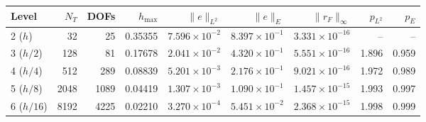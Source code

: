 \begin{tabular}{@{}lrrrrrrrr@{}}
\toprule
Level & $N_T$ & DOFs & $h_{\max}$ & $\|e\|_{L^2}$ & $\|e\|_E$ & $\|r_F\|_\infty$ & $p_{L^2}$ & $p_E$\\
\midrule
2 ($h$) & 32 & 25 & 0.35355 & $7.596\times10^{-2}$ & $8.397\times10^{-1}$ & $3.331\times10^{-16}$ & -- & --\\
3 ($h/2$) & 128 & 81 & 0.17678 & $2.041\times10^{-2}$ & $4.320\times10^{-1}$ & $5.551\times10^{-16}$ & 1.896 & 0.959\\
4 ($h/4$) & 512 & 289 & 0.08839 & $5.201\times10^{-3}$ & $2.176\times10^{-1}$ & $9.021\times10^{-16}$ & 1.972 & 0.989\\
5 ($h/8$) & 2048 & 1089 & 0.04419 & $1.307\times10^{-3}$ & $1.090\times10^{-1}$ & $1.457\times10^{-15}$ & 1.993 & 0.997\\
6 ($h/16$) & 8192 & 4225 & 0.02210 & $3.270\times10^{-4}$ & $5.451\times10^{-2}$ & $2.368\times10^{-15}$ & 1.998 & 0.999\\
\bottomrule
\end{tabular}

